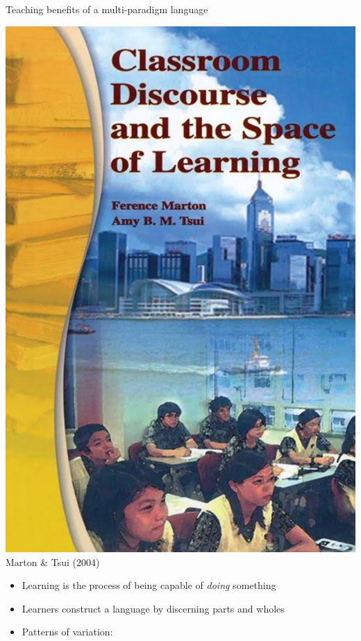 \documentclass[aspectratio=169]{beamer}
\newenvironment{Slide}[1]%
  {\begin{frame}[environment=Slide]{#1}}
  {\end{frame}}%
\begin{document}
\begin{Slide}{Teaching benefits of a multi-paradigm language}
\begin{minipage}{0.2\textwidth}
  \includegraphics[height=0.52\textheight]{Pictures/marton}\\
  {\small Marton \& Tsui \newline (2004)}
\end{minipage}%
\begin{minipage}{0.85\textwidth}
  \begin{itemize}
    \item Learning is the process of being capable of \textit{doing} something
    \item Learners construct a language by discerning parts and wholes %
    \item Patterns of variation:

\end{itemize}
\end{minipage}
\end{Slide}
\end{document}
